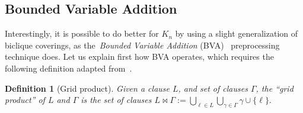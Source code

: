 \documentclass[11pt]{article}
\newtheorem{definition}[theorem]{Definition}
\begin{document}
\subsection{Bounded Variable Addition}

Interestingly, it is possible to do better for $K_n$ by using a slight generalization of biclique coverings, as the~\emph{Bounded Variable Addition} (BVA)~\citep{mantheyAutomatedReencodingBoolean2012} preprocessing technique does. Let us explain first how BVA operates, which requires the following definition adapted from~\citet{haberlandtEffectiveAuxiliaryVariables2023}.
\begin{definition}[Grid product]
    Given a clause $L$, and set of clauses $\Gamma$, the \emph{``grid product''} of $L$ and $\Gamma$ is the set of clauses
    \(
    L \bowtie \Gamma := \bigcup_{\ell \in L} \bigcup_{\gamma \in \Gamma} \gamma \cup \{\ell\}. 
    \)
\end{definition}
\end{document}
